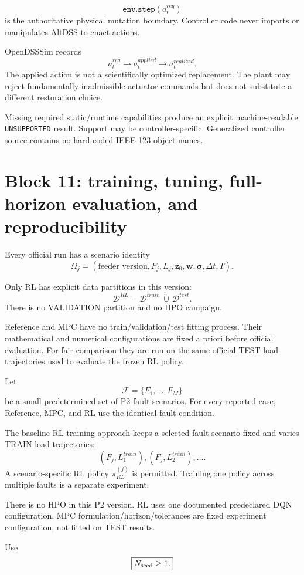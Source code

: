 \documentclass[11pt]{article}
\begin{document}
\[
\boxed{\texttt{env.step}(a_t^{req})}
\]
is the authoritative physical mutation boundary. Controller code never imports or
manipulates AltDSS to enact actions.

OpenDSSSim records
\[
a_t^{req}\rightarrow a_t^{applied}\rightarrow a_t^{realized}.
\]
The applied action is not a scientifically optimized replacement. The plant may reject
fundamentally inadmissible actuator commands but does not substitute a different
restoration choice.

Missing required static/runtime capabilities produce an explicit machine-readable
\texttt{UNSUPPORTED} result. Support may be controller-specific. Generalized controller
source contains no hard-coded IEEE-123 object names.

\section{Block 11: training, tuning, full-horizon evaluation, and reproducibility}
Every official run has a scenario identity
\[
\Omega_j
=
(\text{feeder version},F_j,L_j,\mathbf z_0,\mathbf w,\boldsymbol\sigma,\Delta t,T).
\]

Only RL has explicit data partitions in this version:
\[
\boxed{
\mathcal D^{RL}
=
\mathcal D^{train}\,\dot\cup\,\mathcal D^{test}.}
\]
There is no VALIDATION partition and no HPO campaign.

Reference and MPC have no train/validation/test fitting process. Their mathematical and
numerical configurations are fixed a priori before official evaluation. For fair
comparison they are run on the same official TEST load trajectories used to evaluate the
frozen RL policy.

Let
\[
\mathcal F=\{F_1,\dots,F_M\}
\]
be a small predetermined set of P2 fault scenarios. For every reported case,
Reference, MPC, and RL use the identical fault condition.

The baseline RL training approach keeps a selected fault scenario fixed and varies TRAIN
load trajectories:
\[
(F_j,L_1^{train}),(F_j,L_2^{train}),\dots.
\]
A scenario-specific RL policy $\pi_{RL}^{(j)}$ is permitted. Training one policy across
multiple faults is a separate experiment.

There is no HPO in this P2 version. RL uses one documented predeclared DQN
configuration. MPC formulation/horizon/tolerances are fixed experiment configuration,
not fitted on TEST results.

Use
\[
\boxed{N_{\rm seed}\ge1.}
\]
\end{document}

